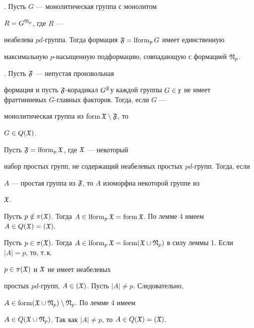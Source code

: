  


\begin{lem} {\em \cite{Ja}}. Пусть $G$ --- монолитическая группа с монолитом 


$R=G^{\frak N_p}$, где $R$ --- 


неабелева $pd$-группа. Тогда формация $\frak F=\operatorname{lform}_pG$ имеет единственную 


максимальную $p$-насыщенную подформацию, совпадающую с формацией $\frak N_p$. 


\end{lem} 


 


\begin{lem} {\em \cite{Ski5}}. Пусть $\frak F$ --- непустая произвольная 


формация и пусть $\frak F$-корадикал $G^{\frak F}$у каждой группы $G\in\frak 


x$ не имеет фраттиниевых $G$-главных факторов. Тогда, если $G$ --- 


монолитическая группа из $\operatorname{form}\frak X\setminus\frak F$, то 


$G\in Q(\frak X)$. 


\end{lem} 


 


\begin{lem} Пусть $\frak F=\operatorname{lform}_p\frak X$, где $\frak X$ --- некоторый 


набор простых групп, не содержащий неабелевых простых $pd$-групп. Тогда, если 


$A$ --- простая группа из $\frak F$, то $A$ изоморфна некоторой группе из 


$\frak X$. 


\end{lem} 


 


\begin{pf} Пусть $p\notin\pi(\frak X)$. Тогда $A\in\lform_p\frak X=\form\frak 


X$. По лемме 4 имеем $A\in Q(\frak X)=(\frak X)$. 


 


Пусть $p\in\pi(\frak X)$. Тогда $A\in\lform_p\frak X=\form(\frak X\cup\frak 


N_p)$ в силу леммы 1. Если $|A|=p$, то, т.\,к. 


$p\in\pi(\frak X)$ и $\frak X$ не имеет неабелевых 


простых $pd$-групп, $A\in(\frak X)$. Пусть $|A|\ne p$. Следовательно, 


$A\in\operatorname{form}(\frak X\cup\frak N_p)\setminus\frak N_p$. По лемме 4 имеем 


$A\in Q(\frak X\cup\frak N_p)$. Так как $|A|\ne p$, то $A\in Q(\frak 


X)=(\frak X)$.


\end{pf} 


